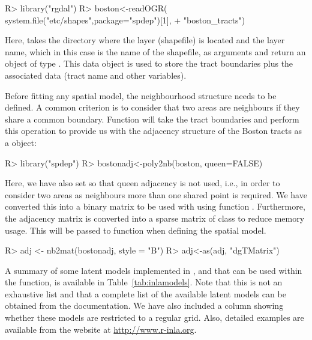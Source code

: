 \documentclass[article]{jss}
\begin{document}
\begin{Schunk}
\begin{Sinput}
R> library("rgdal")
R> boston<-readOGR( system.file("etc/shapes",package="spdep")[1], 
+     "boston_tracts")
\end{Sinput}
\end{Schunk}
\noindent
Here,  takes the directory where the layer (shapefile) is 
located and the layer name, which in this case is the name of the shapefile,
as arguments and return an object of type .
This data object is used to store the tract boundaries plus the associated
data (tract name and other variables). 

Before fitting any spatial model, the neighbourhood structure needs to be
defined.  A common criterion is to consider that two areas are neighbours if 
they share a common boundary. Function  will take the tract
boundaries and perform this operation to provide us with the adjacency structure
of the Boston tracts as a  object:

\begin{Schunk}
\begin{Sinput}
R> library("spdep")
R> bostonadj<-poly2nb(boston, queen=FALSE)
\end{Sinput}
\end{Schunk}
\noindent
Here, we have also set  so that queen adjacency is not used,
i.e., in order to consider two areas as neighbours more than one shared point
is required.  We have converted this into a binary matrix to be used with
 using function .  Furthermore, the adjacency matrix
is converted into a sparse matrix of class  to reduce memory
usage.  This will be passed to function  when defining the spatial
model. 


\begin{Schunk}
\begin{Sinput}
R> adj <- nb2mat(bostonadj, style = "B")
R> adj<-as(adj, "dgTMatrix")
\end{Sinput}
\end{Schunk}
\noindent

A summary of some latent models implemented in , and that can be
used within the  function, is available in
Table~\ref{tab:inlamodels}. Note that this is not an exhaustive list and that a
complete list of the available latent models can be obtained from the
 documentation. We have also included a column showing whether these models are
restricted to a regular grid. Also, detailed examples are available from the
 website at \url{http://www.r-inla.org}.
\end{document}
